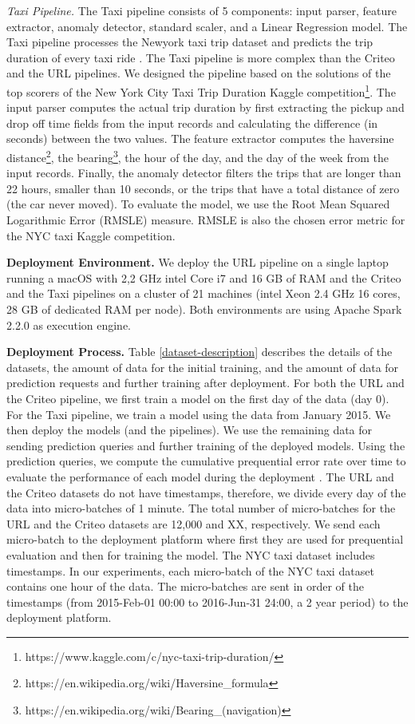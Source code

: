 \textit{Taxi Pipeline.}
The Taxi pipeline consists of 5 components: input parser, feature extractor, anomaly detector, standard scaler, and a Linear Regression model.
The Taxi pipeline processes the Newyork taxi trip dataset and predicts the trip duration of every taxi ride \cite{newyork-taxi}. 
The Taxi pipeline is more complex than the Criteo and the URL pipelines. 
We designed the pipeline based on the solutions of the top scorers of the New York City Taxi Trip Duration Kaggle competition\footnote{https://www.kaggle.com/c/nyc-taxi-trip-duration/}. 
The input parser computes the actual trip duration by first extracting the pickup and drop off time fields from the input records and calculating the difference (in seconds) between the two values.
The feature extractor computes the haversine distance\footnote{https://en.wikipedia.org/wiki/Haversine\_formula}, the bearing\footnote{https://en.wikipedia.org/wiki/Bearing\_(navigation)}, the hour of the day, and the day of the week from the input records. 
Finally, the anomaly detector filters the trips that are longer than 22 hours, smaller than 10 seconds, or the trips that have a total distance of zero (the car never moved).
To evaluate the model, we use the Root Mean Squared Logarithmic Error (RMSLE) measure.
RMSLE is also the chosen error metric for the NYC taxi Kaggle competition.

\textbf{Deployment Environment. }
We deploy the URL pipeline on a single laptop running a macOS with 2,2 GHz intel Core i7 and 16 GB of RAM and the Criteo and the Taxi pipelines on a cluster of 21 machines (intel Xeon 2.4 GHz 16 cores, 28 GB of dedicated RAM per node).
Both environments are using Apache Spark 2.2.0 as execution engine.

\textbf{Deployment Process. }
Table \ref{dataset-description} describes the details of the datasets, the amount of data for the initial training, and the amount of data for prediction requests and further training after deployment. 
For both the URL and the Criteo pipeline, we first train a model on the first day of the data (day 0).
For the Taxi pipeline, we train a model using the data from January 2015.
We then deploy the models (and the pipelines).
We use the remaining data for sending prediction queries and further training of the deployed models.
Using the prediction queries, we compute the cumulative prequential error rate over time to evaluate the performance of each model during the deployment \cite{dawid1984present}.
The URL and the Criteo datasets do not have timestamps, therefore, we divide every day of the data into micro-batches of 1 minute.
The total number of micro-batches for the URL and the Criteo datasets are 12,000 and XX, respectively.
We send each micro-batch to the deployment platform where first they are used for prequential evaluation and then for training the model.
The NYC taxi dataset includes timestamps. 
In our experiments, each micro-batch of the NYC taxi dataset contains one hour of the data. 
The micro-batches are sent in order of the timestamps (from 2015-Feb-01  00:00 to 2016-Jun-31 24:00, a 2 year period) to the deployment platform.


